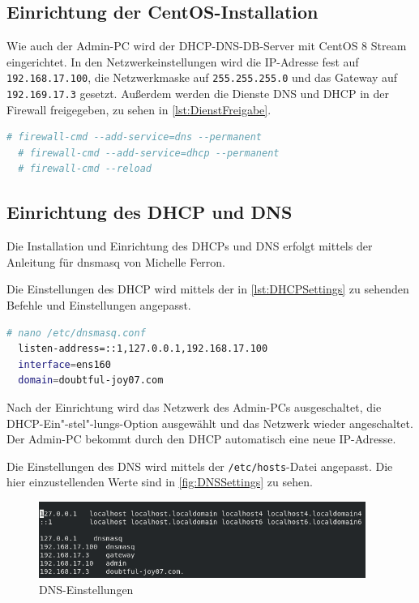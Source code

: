 \documentclass[a4paper,
    11pt,
    headings=small,
    ngerman,
    listof=totoc,
    numbers=noenddot]{scrreprt}[2021/11/13]
\begin{document}
\subsection{Einrichtung der CentOS-Installation}

Wie auch der Admin-PC wird der \ac{DHCP}-\ac{DNS}-\ac{DB}-Server mit CentOS 8 Stream eingerichtet. In den Netzwerkeinstellungen wird die IP-Adresse fest auf \texttt{192.168.17.100}, die Netzwerkmaske auf \texttt{255.255.255.0} und das Gateway auf \texttt{192.169.17.3} gesetzt. Außerdem werden die Dienste \ac{DNS} und \ac{DHCP} in der Firewall freigegeben, zu sehen in \vref{lst:DienstFreigabe}.

\begin{lstlisting}[language=bash,caption={Dienste-Freigabe einer CentOS-Firewall},label={lst:DienstFreigabe}]
  # firewall-cmd --add-service=dns --permanent
  # firewall-cmd --add-service=dhcp --permanent
  # firewall-cmd --reload
\end{lstlisting}


\subsection{Einrichtung des DHCP und DNS}

Die Installation und Einrichtung des \ac{DHCP}s und \ac{DNS} erfolgt mittels der Anleitung für dnsmasq von Michelle Ferron. \autocite{zextras:DHCPDNS}

Die Einstellungen des \ac{DHCP} wird mittels der in \vref{lst:DHCPSettings} zu sehenden Befehle und Einstellungen angepasst.

\begin{lstlisting}[language=bash,caption={DHCP-Einstellungen},label={lst:DHCPSettings}]
  # nano /etc/dnsmasq.conf
  listen-address=::1,127.0.0.1,192.168.17.100
  interface=ens160
  domain=doubtful-joy07.com
\end{lstlisting}

Nach der Einrichtung wird das Netzwerk des Admin-PCs ausgeschaltet, die \ac{DHCP}-Ein"-stel"-lungs-Option ausgewählt und das Netzwerk wieder angeschaltet. Der Admin-PC bekommt durch den DHCP automatisch eine neue IP-Adresse.

Die Einstellungen des \ac{DNS} wird mittels der \texttt{/etc/hosts}-Datei angepasst. Die hier einzustellenden Werte sind in \vref{fig:DNSSettings} zu sehen.

\begin{figure}[htbp]
  \centering
  \includegraphics[width=0.95\textwidth]{data/dns-hosts-file.png}
  \caption{DNS-Einstellungen}
  \label{fig:DNSSettings}
\end{figure}
\end{document}
